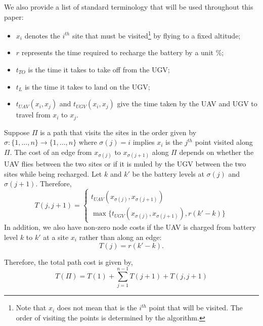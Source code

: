 \documentclass[letterpaper,10pt,conference]{ieeeconf}
\newcommand{\pcomment}[1]{\textcolor{red}{#1}}
\begin{document}
We also provide a list of standard terminology that will be used throughout this paper:
\begin{itemize} \label{terminology}
\item $x_i$ denotes the $i^{th}$ site that must be visited\footnote{Note that $x_i$ does not mean that is the $i^{th}$ point that will be visited. The order of visiting the points is determined by the algorithm.} by flying to a fixed altitude;
\item $r$ represents the time required to recharge the battery by a unit \%;
\item $t_{TO}$ is the time it takes to take off from the UGV;
\item $t_{L}$ is the time it takes to land on the UGV;
\item $t_{UAV}(x_i,x_j)$ and $t_{UGV}(x_i,x_j)$ give the time taken by the UAV and UGV to travel from $x_i$ to $x_j$.
\end{itemize}

Suppose $\Pi$ is a path that visits the sites in the order given by $\sigma:
\{1,\ldots,n\}\rightarrow \{1,\ldots,n\}$ where $\sigma(j) = i$ implies $x_i$ is the $j^{th}$ point visited along $\Pi$. The cost of an edge from $x_{\sigma(j)}$ to $x_{\sigma(j+1)}$ along $\Pi$ depends on whether the UAV flies between the two sites or if it is muled by the UGV between the two sites while being recharged. Let $k$ and $k'$ be the battery levels at $\sigma(j)$ and $\sigma(j+1)$. Therefore, 
\begin{equation}
T(j,j+1) = \begin{cases}
t_{UAV}(x_{\sigma(j)},x_{\sigma(j+1)})\\
\max \{t_{UGV}(x_{\sigma(j)},x_{\sigma(j+1)}),r(k'-k)\}
\end{cases}
\end{equation}
In addition, we also have non-zero node costs if the UAV is charged from battery level $k$ to $k'$ at a site $x_i$ rather than along an edge:
\begin{equation}
T(j) = r(k'-k).
\end{equation}

Therefore, the total path cost is given by,
\begin{equation}
T(\Pi) = T(1) + \sum_{j=1}^{n-1} T(j+1) + T(j,j+1)
\label{eqn:pathcost}
\end{equation}
\end{document}
